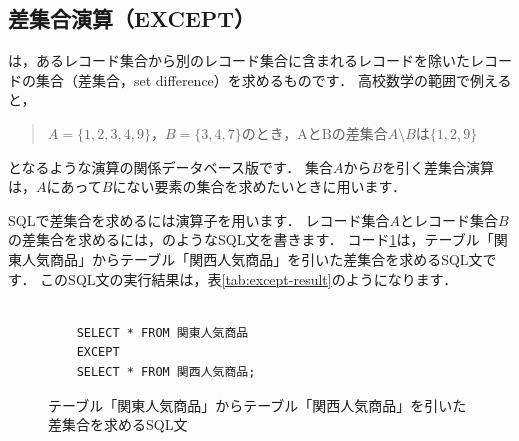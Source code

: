 \subsection{差集合演算（EXCEPT）}
は，あるレコード集合から別のレコード集合に含まれるレコードを除いたレコードの集合（差集合，set difference）を求めるものです．
高校数学の範囲で例えると，
\begin{quotation}
$A=\{1, 2, 3, 4, 9\}$，$B=\{3, 4, 7\}$のとき，AとBの差集合$A \setminus B$は$\{1, 2, 9\}$
\end{quotation}
となるような演算の関係データベース版です．
集合$A$から$B$を引く差集合演算は，$A$にあって$B$にない要素の集合を求めたいときに用います．

SQLで差集合を求めるには演算子を用います．
レコード集合$A$とレコード集合$B$の差集合を求めるには，のようなSQL文を書きます．
コード\ref{code:sql-except}は，テーブル「関東人気商品」からテーブル「関西人気商品」を引いた差集合を求めるSQL文です．
このSQL文の実行結果は，表\ref{tab:except-result}のようになります．
\begin{figure}[!htbp]
    \begin{verbatim}

    SELECT * FROM 関東人気商品
    EXCEPT
    SELECT * FROM 関西人気商品;

    \end{verbatim}
    \captionsetup{name=コード}
    \caption{テーブル「関東人気商品」からテーブル「関西人気商品」を引いた差集合を求めるSQL文}
    \label{code:sql-except}
\end{figure}
\begin{table}[!htbp]
    \centering
    \caption{テーブル「関東人気商品」からテーブル「関西人気商品」を引いた差集合を求めるSQL文の実行結果}
    \label{tab:except-result}
\end{table}

